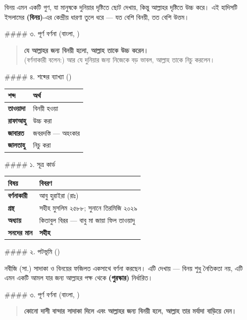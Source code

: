 বিনয় এমন একটি গুণ, যা মানুষকে দুনিয়ার দৃষ্টিতে ছোট দেখায়, কিন্তু আল্লাহর দৃষ্টিতে উচ্চ করে। এই হাদিসটি ইসলামের \textbf{ (বিনয়)}-এর কেন্দ্রীয় ধারণা তুলে ধরে — যত বেশি বিনয়ী, তত বেশি উত্তম।

\#\#\#\# ৩. পূর্ণ বর্ণনা (বাংলা, )

\begin{quote}
\textbf{যে আল্লাহর জন্য বিনয়ী হলো, আল্লাহ তাকে উচ্চ করেন।} \\
(বর্ণনাকারী বলেন:) আর যে দুনিয়ার জন্য নিজেকে বড় ভাবল, আল্লাহ তাকে নিচু করলেন।
\end{quote}

\#\#\#\# ৪. শব্দের ব্যাখ্যা ()

\begin{table}[h]\centering\small
\begin{tabular}{ll}
শব্দ & অর্থ \\
\hline
\textbf{তাওয়াদা} & বিনয়ী হওয়া \\
\textbf{রাফাআহু} & উচ্চ করা \\
\textbf{জাবারত} & জবরদস্তি — অহংকার \\
\textbf{জালতাহু} & নিচু করা \\
\hline
\end{tabular}
\end{table}

\#\#\#\# ১. সূত্র কার্ড

\begin{table}[h]\centering\small
\begin{tabular}{ll}
বিষয় & বিবরণ \\
\hline
\textbf{বর্ণনাকারী} & আবু হুরাইরা (রাঃ) \\
\textbf{গ্রন্থ} & সহীহ মুসলিম ২৫৮৮; সুনানে তিরমিজি ২০২৯ \\
\textbf{অধ্যায়} & কিতাবুল বিরর — বাবু মা জায়া ফিল তাওয়াদু \\
\textbf{সনদের মান} & \textbf{সহীহ} \\
\hline
\end{tabular}
\end{table}

\#\#\#\# ২. পটভূমি ()

নবীজি (সা.) সাদাকা ও বিনয়ের ফজিলত একসাথে বর্ণনা করছেন। এটি দেখায় — বিনয় শুধু নৈতিকতা নয়, এটি এমন একটি আমল যার জন্য আল্লাহর পক্ষ থেকে \textbf{ (পুরস্কার)} নির্ধারিত।

\#\#\#\# ৩. পূর্ণ বর্ণনা (বাংলা, )

\begin{quote}
\textbf{কোনো দাসী বান্দার সাদাকা দিলে এবং আল্লাহর জন্য বিনয়ী হলে, আল্লাহ তার মর্যাদা বাড়িয়ে দেন।}
\end{quote}

